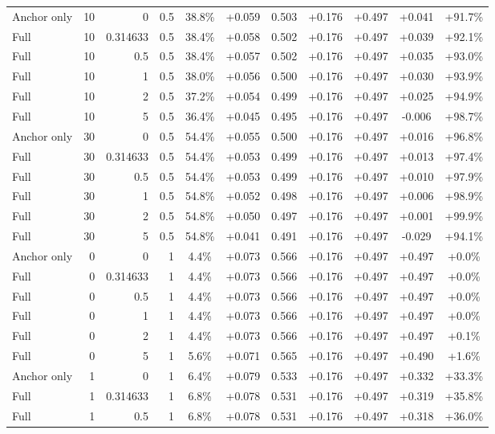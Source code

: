 \begin{table}[htbp]
\begin{tabular}{lrrrccccccc}
Anchor only & 10 & 0 & 0.5 & 38.8\% & +0.059 & 0.503 & +0.176 & +0.497 & +0.041 & +91.7\% \\
Full & 10 & 0.314633 & 0.5 & 38.4\% & +0.058 & 0.502 & +0.176 & +0.497 & +0.039 & +92.1\% \\
Full & 10 & 0.5 & 0.5 & 38.4\% & +0.057 & 0.502 & +0.176 & +0.497 & +0.035 & +93.0\% \\
Full & 10 & 1 & 0.5 & 38.0\% & +0.056 & 0.500 & +0.176 & +0.497 & +0.030 & +93.9\% \\
Full & 10 & 2 & 0.5 & 37.2\% & +0.054 & 0.499 & +0.176 & +0.497 & +0.025 & +94.9\% \\
Full & 10 & 5 & 0.5 & 36.4\% & +0.045 & 0.495 & +0.176 & +0.497 & -0.006 & +98.7\% \\
Anchor only & 30 & 0 & 0.5 & 54.4\% & +0.055 & 0.500 & +0.176 & +0.497 & +0.016 & +96.8\% \\
Full & 30 & 0.314633 & 0.5 & 54.4\% & +0.053 & 0.499 & +0.176 & +0.497 & +0.013 & +97.4\% \\
Full & 30 & 0.5 & 0.5 & 54.4\% & +0.053 & 0.499 & +0.176 & +0.497 & +0.010 & +97.9\% \\
Full & 30 & 1 & 0.5 & 54.8\% & +0.052 & 0.498 & +0.176 & +0.497 & +0.006 & +98.9\% \\
Full & 30 & 2 & 0.5 & 54.8\% & +0.050 & 0.497 & +0.176 & +0.497 & +0.001 & +99.9\% \\
Full & 30 & 5 & 0.5 & 54.8\% & +0.041 & 0.491 & +0.176 & +0.497 & -0.029 & +94.1\% \\
Anchor only & 0 & 0 & 1 & 4.4\% & +0.073 & 0.566 & +0.176 & +0.497 & +0.497 & +0.0\% \\
Full & 0 & 0.314633 & 1 & 4.4\% & +0.073 & 0.566 & +0.176 & +0.497 & +0.497 & +0.0\% \\
Full & 0 & 0.5 & 1 & 4.4\% & +0.073 & 0.566 & +0.176 & +0.497 & +0.497 & +0.0\% \\
Full & 0 & 1 & 1 & 4.4\% & +0.073 & 0.566 & +0.176 & +0.497 & +0.497 & +0.0\% \\
Full & 0 & 2 & 1 & 4.4\% & +0.073 & 0.566 & +0.176 & +0.497 & +0.497 & +0.1\% \\
Full & 0 & 5 & 1 & 5.6\% & +0.071 & 0.565 & +0.176 & +0.497 & +0.490 & +1.6\% \\
Anchor only & 1 & 0 & 1 & 6.4\% & +0.079 & 0.533 & +0.176 & +0.497 & +0.332 & +33.3\% \\
Full & 1 & 0.314633 & 1 & 6.8\% & +0.078 & 0.531 & +0.176 & +0.497 & +0.319 & +35.8\% \\
Full & 1 & 0.5 & 1 & 6.8\% & +0.078 & 0.531 & +0.176 & +0.497 & +0.318 & +36.0\% \\

\end{tabular}
\end{table}
